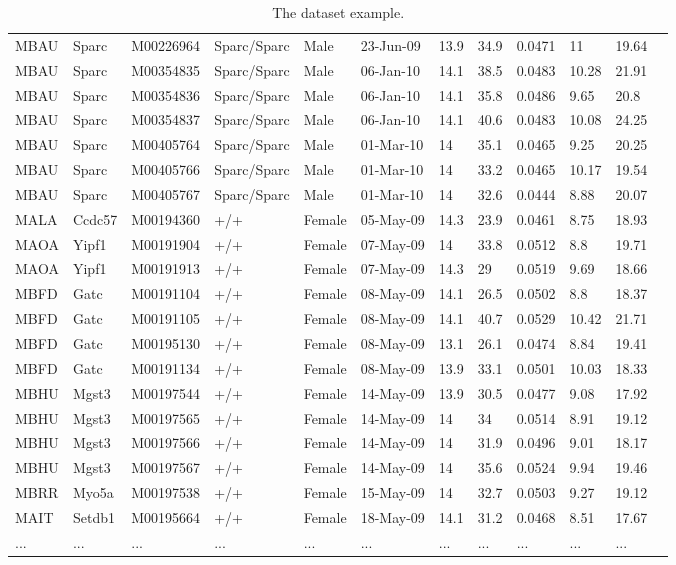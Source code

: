 \documentclass[12pt,a4paper]{article}
\begin{document}
\begin{table}
\begin{tabular}{| p{13mm} | p{13mm} | l | l | l | p{19mm}| p{12mm} | l | p{13mm} | p{12mm} | p{12mm} | l |}
MBAU&Sparc&M00226964&Sparc/Sparc&Male&23-Jun-09&13.9&34.9&0.0471&11&19.64&\\
MBAU&Sparc&M00354835&Sparc/Sparc&Male&06-Jan-10&14.1&38.5&0.0483&10.28&21.91&\\
MBAU&Sparc&M00354836&Sparc/Sparc&Male&06-Jan-10&14.1&35.8&0.0486&9.65&20.8&\\
MBAU&Sparc&M00354837&Sparc/Sparc&Male&06-Jan-10&14.1&40.6&0.0483&10.08&24.25&\\
MBAU&Sparc&M00405764&Sparc/Sparc&Male&01-Mar-10&14&35.1&0.0465&9.25&20.25&\\
MBAU&Sparc&M00405766&Sparc/Sparc&Male&01-Mar-10&14&33.2&0.0465&10.17&19.54&\\
MBAU&Sparc&M00405767&Sparc/Sparc&Male&01-Mar-10&14&32.6&0.0444&8.88&20.07&\\
MALA&Ccdc57&M00194360&+/+&Female&05-May-09&14.3&23.9&0.0461&8.75&18.93&\\
MAOA&Yipf1&M00191904&+/+&Female&07-May-09&14&33.8&0.0512&8.8&19.71&\\
MAOA&Yipf1&M00191913&+/+&Female&07-May-09&14.3&29&0.0519&9.69&18.66&\\
MBFD&Gatc&M00191104&+/+&Female&08-May-09&14.1&26.5&0.0502&8.8&18.37&\\
MBFD&Gatc&M00191105&+/+&Female&08-May-09&14.1&40.7&0.0529&10.42&21.71&\\
MBFD&Gatc&M00195130&+/+&Female&08-May-09&13.1&26.1&0.0474&8.84&19.41&\\
MBFD&Gatc&M00191134&+/+&Female&08-May-09&13.9&33.1&0.0501&10.03&18.33&\\
MBHU&Mgst3&M00197544&+/+&Female&14-May-09&13.9&30.5&0.0477&9.08&17.92&\\
MBHU&Mgst3&M00197565&+/+&Female&14-May-09&14&34&0.0514&8.91&19.12&\\
MBHU&Mgst3&M00197566&+/+&Female&14-May-09&14&31.9&0.0496&9.01&18.17&\\
MBHU&Mgst3&M00197567&+/+&Female&14-May-09&14&35.6&0.0524&9.94&19.46&\\
MBRR&Myo5a&M00197538&+/+&Female&15-May-09&14&32.7&0.0503&9.27&19.12&\\
MAIT&Setdb1&M00195664&+/+&Female&18-May-09&14.1&31.2&0.0468&8.51&17.67&\\
...&...&...&...&...&...&...&...&...&...&...&\\
\hline  
\end{tabular}
\caption{The dataset example.}\label{table:01}
\end{table}
\end{document}
